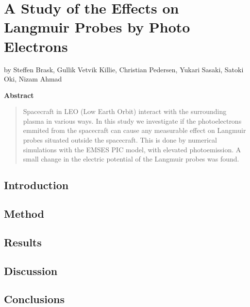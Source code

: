 \documentclass[captions=tableheading,twoside]{scrbook}
\newcommand{\agfauthor}[1]{%
	\begin{center}by #1\end{center}}
\newenvironment{Abstract}{\begin{center}\textbf{Abstract}\end{center}%
	\begin{quote}}{\end{quote}}
\begin{document}
\chapter*{A Study of the Effects on Langmuir Probes by Photo Electrons}
\agfauthor{Steffen Brask, Gullik Vetvik Killie, Christian Pedersen, Yukari Sasaki, Satoki Oki, Nizam Ahmad}

\begin{Abstract}
	Spacecraft in LEO (Low Earth Orbit) interact with the surrounding plasma in various ways.
 	In this study we investigate if the photoelectrons emmited from the spacecraft can cause any
	measurable effect on Langmuir probes situated outside the spacecraft. This is done by numerical
 	simulations with the EMSES PIC model, with elevated photoemission. A small change in the electric potential of the Langmuir probes was found. 
\end{Abstract}

\section{Introduction}


\section{Method}


\section{Results}


\section{Discussion}


\section{Conclusions}



% 
\printbibliography
\end{document}

